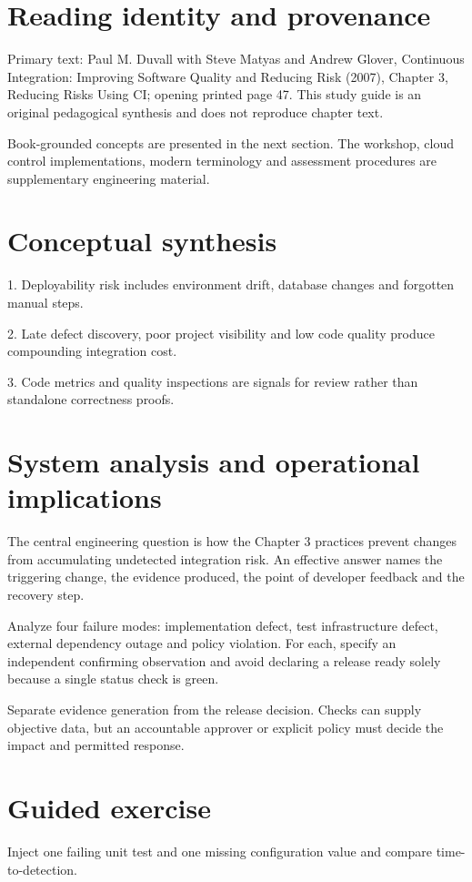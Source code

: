 \documentclass[11pt,letterpaper]{article}
\begin{document}
\makedoctitle
\makedocsummary
\tableofcontents
\clearpage
\section{Reading identity and provenance}
Primary text: Paul M. Duvall with Steve Matyas and Andrew Glover, Continuous Integration: Improving Software Quality and Reducing Risk (2007), Chapter 3, Reducing Risks Using CI; opening printed page 47. This study guide is an original pedagogical synthesis and does not reproduce chapter text.

Book-grounded concepts are presented in the next section. The workshop, cloud control implementations, modern terminology and assessment procedures are supplementary engineering material.

\section{Conceptual synthesis}
1. Deployability risk includes environment drift, database changes and forgotten manual steps.

2. Late defect discovery, poor project visibility and low code quality produce compounding integration cost.

3. Code metrics and quality inspections are signals for review rather than standalone correctness proofs.

\section{System analysis and operational implications}
The central engineering question is how the Chapter 3 practices prevent changes from accumulating undetected integration risk. An effective answer names the triggering change, the evidence produced, the point of developer feedback and the recovery step.

Analyze four failure modes: implementation defect, test infrastructure defect, external dependency outage and policy violation. For each, specify an independent confirming observation and avoid declaring a release ready solely because a single status check is green.

Separate evidence generation from the release decision. Checks can supply objective data, but an accountable approver or explicit policy must decide the impact and permitted response.

\section{Guided exercise}
Inject one failing unit test and one missing configuration value and compare time-to-detection.
\end{document}
